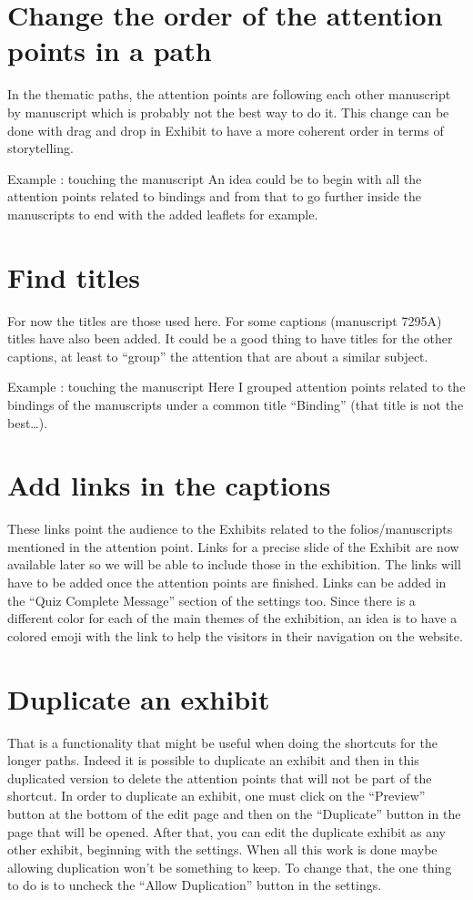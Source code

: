 \documentclass{article}
\begin{document}
    \section{Change the order of the attention points in a path}
    In the thematic paths, the attention points are following each other manuscript by manuscript which is probably not the best way to do it. This change can be done with drag and drop in Exhibit to have a more coherent order in terms of storytelling. 

    Example : touching the manuscript 
    An idea could be to begin with all the attention points related to bindings and from that to go further inside the manuscripts to end with the added leaflets for example. 

    \section{Find titles}
    For now the titles are those used here. For some captions (manuscript 7295A) titles have also been added. It could be a good thing to have titles for the other captions, at least to “group” the attention that are about a similar subject. 

    Example : touching the manuscript 
    Here I grouped attention points related to the bindings of the manuscripts under a common title “Binding” (that title is not the best…). 

    \section{Add links in the captions}
    These links point the audience to the Exhibits related to the folios/manuscripts mentioned in the attention point. Links for a precise slide of the Exhibit are now available later so we will  be able to include those in the exhibition. The links will have to be added once the attention points are finished.  
    Links can be added in the “Quiz Complete Message” section of the settings too. 
    Since there is a different color for each of the main themes of the exhibition, an idea is to have a colored emoji with the link to help the visitors in their navigation on the website. 

    \section{Duplicate an exhibit}
    That is a functionality that might be useful when doing the shortcuts for the longer paths. Indeed it is possible to duplicate an exhibit and then in this duplicated version to delete the attention points that will not be part of the shortcut. 
    In order to duplicate an exhibit, one must click on the “Preview” button at the bottom of the edit page and then on the “Duplicate” button in the page that will be opened. After that, you can edit the duplicate exhibit as any other exhibit, beginning with the settings. 
    When all this work is done maybe allowing duplication won’t be something to keep. To change that, the one thing to do is to uncheck the “Allow Duplication” button in the settings. 
\end{document}
